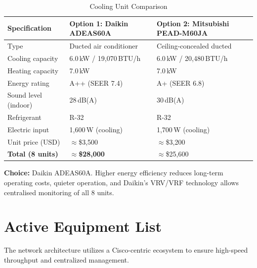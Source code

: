 \documentclass[12pt,a4paper]{report}
\begin{document}
\begin{table}[H]
  \centering
  \caption{Cooling Unit Comparison}
  \label{tab:cooling_compare}
  \begin{tabular}{L{3.8cm} L{5.2cm} L{5.2cm}}
    \toprule
    \textbf{Specification} & \textbf{Option 1: Daikin ADEAS60A} & \textbf{Option 2: Mitsubishi PEAD-M60JA} \\
    \midrule
    Type                   & Ducted air conditioner         & Ceiling-concealed ducted \\
    Cooling capacity       & 6.0\,kW / 19{,}070\,BTU/h     & 6.0\,kW / 20{,}480\,BTU/h \\
    Heating capacity       & 7.0\,kW                        & 7.0\,kW \\
    Energy rating          & A++ (SEER 7.4)                 & A+ (SEER 6.8) \\
    Sound level (indoor)   & 28\,dB(A)                      & 30\,dB(A) \\
    Refrigerant            & R-32                           & R-32 \\
    Electric input         & 1{,}600\,W (cooling)           & 1{,}700\,W (cooling) \\
    Unit price (USD)       & $\approx$\$3{,}500             & $\approx$\$3{,}200 \\
    \textbf{Total (8 units)} & $\approx$\textbf{\$28{,}000} & $\approx$\$25{,}600 \\
    \bottomrule
  \end{tabular}
\end{table}

\textbf{Choice:} Daikin ADEAS60A.
Higher energy efficiency reduces long-term operating costs,
quieter operation, and Daikin's VRV/VRF technology
allows centralised monitoring of all 8 units.


\chapter{Active Equipment List}

The network architecture utilizes a Cisco-centric ecosystem to ensure high-speed throughput and centralized management.
\end{document}
